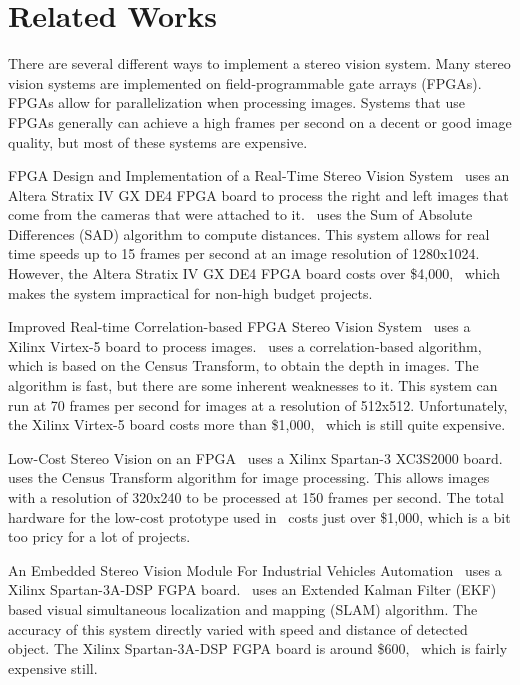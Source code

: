 \chapter{Related Works}

There are several different ways to implement a stereo vision system. Many stereo vision systems are implemented on field-programmable gate arrays (FPGAs). FPGAs allow for parallelization when processing images. Systems that use FPGAs generally can achieve a high frames per second on a decent or good image quality, but most of these systems are expensive. 

FPGA Design and Implementation of a Real-Time Stereo Vision System~\cite{alteraStratixIVPaper} uses an Altera Stratix IV GX DE4 FPGA board to process the right and left images that come from the cameras that were attached to it.~\cite{alteraStratixIVPaper} uses the Sum of Absolute Differences (SAD) algorithm to compute distances. This system allows for real time speeds up to 15 frames per second at an image resolution of 1280x1024. However, the Altera Stratix IV GX DE4 FPGA board costs over \$4,000,~\cite{alteraStratixIVBoard} which makes the system impractical for non-high budget projects.

Improved Real-time Correlation-based FPGA Stereo Vision System~\cite{xilinxVirtex5Paper} uses a Xilinx Virtex-5 board to process images.~\cite{xilinxVirtex5Paper} uses a correlation-based algorithm, which is based on the Census Transform, to obtain the depth in images. The algorithm is fast, but there are some inherent weaknesses to it. This system can run at 70 frames per second for images at a resolution of 512x512. Unfortunately, the Xilinx Virtex-5 board costs more than \$1,000,~\cite{xilinxVirtex5Board} which is still quite expensive.

Low-Cost Stereo Vision on an FPGA~\cite{lowCost1000} uses a Xilinx Spartan-3 XC3S2000 board.~\cite{lowCost1000} uses the Census Transform algorithm for image processing. This allows images with a resolution of 320x240 to be processed at 150 frames per second. The total hardware for the low-cost prototype used in~\cite{lowCost1000} costs just over \$1,000, which is a bit too pricy for a lot of projects.

An Embedded Stereo Vision Module For Industrial Vehicles Automation~\cite{xilinxSpartan3APaper} uses a Xilinx Spartan-3A-DSP FGPA board.~\cite{xilinxSpartan3APaper} uses an Extended Kalman Filter (EKF) based visual simultaneous localization and mapping (SLAM) algorithm. The accuracy of this system directly varied with speed and distance of detected object. The Xilinx Spartan-3A-DSP FGPA board is  around \$600,~\cite{xilinxSpartan3ABoard} which is fairly expensive still.

